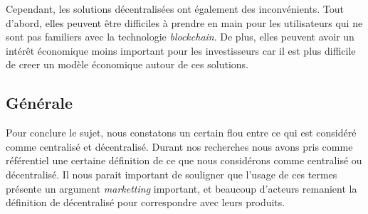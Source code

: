 Cependant, les solutions décentralisées ont également des inconvénients. Tout d’abord, elles peuvent être 
difficiles à prendre en main pour les utilisateurs qui ne sont pas familiers avec la technologie \textit{blockchain}. 
De plus, elles peuvent avoir un intérêt économique moins important pour les investisseurs car il est plus
difficile de creer un modèle économique autour de ces solutions.

\subsection{Générale}
Pour conclure le sujet, nous constatons un certain flou entre ce qui est considéré comme centralisé et décentralisé. 
Durant nos recherches nous avons pris comme référentiel une certaine définition de ce que nous considérons comme
centralisé ou décentralisé. Il nous parait important de souligner que l'usage de ces termes présente un argument \textit{marketting}
important, et beaucoup d'acteurs remanient la définition de décentralisé pour correspondre avec leurs produits.



